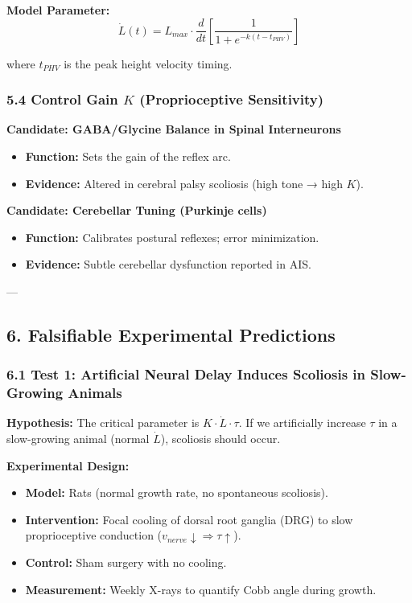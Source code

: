 \documentclass[11pt,a4paper]{article}
\begin{document}
\textbf{Model Parameter:}
$$
\dot{L}(t) = L_{max} \cdot \frac{d}{dt}\left[\frac{1}{1 + e^{-k(t-t_{PHV})}}\right]
$$

where $t_{PHV}$ is the peak height velocity timing.

\subsubsection{5.4 Control Gain $K$ (Proprioceptive Sensitivity)}

\textbf{Candidate: GABA/Glycine Balance in Spinal Interneurons}

\begin{itemize}
\item \textbf{Function:} Sets the gain of the reflex arc.
\item \textbf{Evidence:} Altered in cerebral palsy scoliosis (high tone → high $K$).
\end{itemize}

\textbf{Candidate: Cerebellar Tuning (Purkinje cells)}

\begin{itemize}
\item \textbf{Function:} Calibrates postural reflexes; error minimization.
\item \textbf{Evidence:} Subtle cerebellar dysfunction reported in AIS.
\end{itemize}

---

\subsection{6. Falsifiable Experimental Predictions}

\subsubsection{6.1 Test 1: Artificial Neural Delay Induces Scoliosis in Slow-Growing Animals}

\textbf{Hypothesis:} The critical parameter is $K \cdot \dot{L} \cdot \tau$. If we artificially increase $\tau$ in a slow-growing animal (normal $\dot{L}$), scoliosis should occur.

\textbf{Experimental Design:}

\begin{itemize}
\item \textbf{Model:} Rats (normal growth rate, no spontaneous scoliosis).
\item \textbf{Intervention:} Focal cooling of dorsal root ganglia (DRG) to slow proprioceptive conduction ($v_{nerve} \downarrow \Rightarrow \tau \uparrow$).
\item \textbf{Control:} Sham surgery with no cooling.
\item \textbf{Measurement:} Weekly X-rays to quantify Cobb angle during growth.
\end{itemize}
\end{document}
